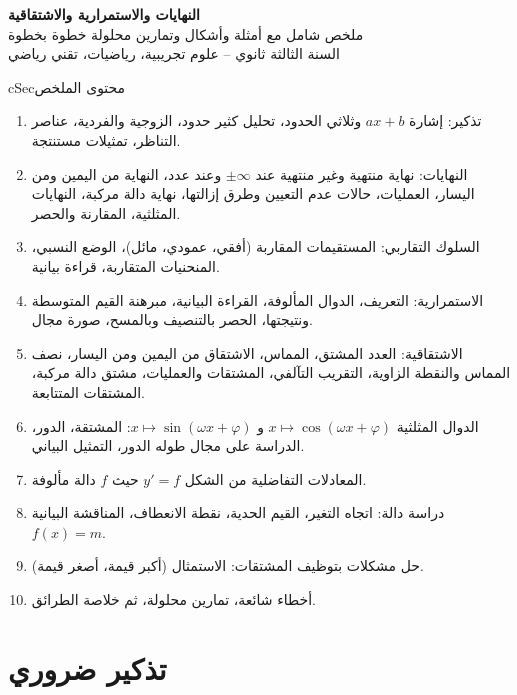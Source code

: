 \documentclass[12pt,a4paper]{article}
\newenvironment{BOX}[2]{\begin{otherlanguage}{english}\begin{arbox}{#1}{#2}}{\end{arbox}\end{otherlanguage}}
\newenvironment{LTR}{\begin{otherlanguage}{english}}{\end{otherlanguage}}
\begin{document}
\begin{LTR}
\begin{tcolorbox}[enhanced,colback=cSec,colframe=cSec,arc=3mm,halign=center,boxrule=0pt,top=12pt,bottom=12pt,before upper={\selectlanguage{arabic}}]
{\color{white}\fontsize{25}{32}\selectfont\bfseries النهايات والاستمرارية والاشتقاقية}\\[8pt]
{\color{white}\large ملخص شامل مع أمثلة وأشكال وتمارين محلولة خطوة بخطوة}\\[5pt]
{\color{white}\large السنة الثالثة ثانوي -- علوم تجريبية، رياضيات، تقني رياضي}
\end{tcolorbox}
\end{LTR}

\begin{BOX}{cSec}{محتوى الملخص}
\begin{enumerate}[label=\textbf{\arabic*.}]
\item تذكير: إشارة $ax+b$ وثلاثي الحدود، تحليل كثير حدود، الزوجية والفردية، عناصر التناظر، تمثيلات مستنتجة.
\item النهايات: نهاية منتهية وغير منتهية عند $\pm\infty$ وعند عدد، النهاية من اليمين ومن اليسار، العمليات، حالات عدم التعيين وطرق إزالتها، نهاية دالة مركبة، النهايات المثلثية، المقارنة والحصر.
\item السلوك التقاربي: المستقيمات المقاربة (أفقي، عمودي، مائل)، الوضع النسبي، المنحنيات المتقاربة، قراءة بيانية.
\item الاستمرارية: التعريف، الدوال المألوفة، القراءة البيانية، مبرهنة القيم المتوسطة ونتيجتها، الحصر بالتنصيف وبالمسح، صورة مجال.
\item الاشتقاقية: العدد المشتق، المماس، الاشتقاق من اليمين ومن اليسار، نصف المماس والنقطة الزاوية، التقريب التآلفي، المشتقات والعمليات، مشتق دالة مركبة، المشتقات المتتابعة.
\item الدوال المثلثية $x\mapsto\cos(\omega x+\varphi)$ و $x\mapsto\sin(\omega x+\varphi)$: المشتقة، الدور، الدراسة على مجال طوله الدور، التمثيل البياني.
\item المعادلات التفاضلية من الشكل $y'=f$ حيث $f$ دالة مألوفة.
\item دراسة دالة: اتجاه التغير، القيم الحدية، نقطة الانعطاف، المناقشة البيانية $f(x)=m$.
\item حل مشكلات بتوظيف المشتقات: الاستمثال (أكبر قيمة، أصغر قيمة).
\item أخطاء شائعة، تمارين محلولة، ثم خلاصة الطرائق.
\end{enumerate}
\end{BOX}
\section{تذكير ضروري}
\end{document}
